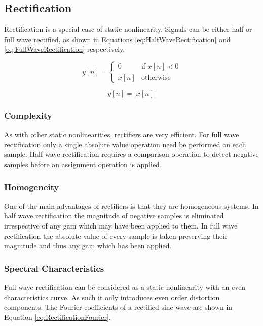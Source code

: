 	\subsection{Rectification}
	\label{sec:Excitation-Rectification}
		Rectification is a special case of static nonlinearity. Signals can be either half or full wave rectified,
		as shown in Equations \ref{eq:HalfWaveRectification} and \ref{eq:FullWaveRectification} respectively.

		\begin{equation}
			y[n] = \begin{cases}
				0 & \text{if $x[n] < 0$} \\
				x[n] & \text{otherwise}
			\end{cases}
			\label{eq:HalfWaveRectification}
		\end{equation}

		\begin{equation}
			y[n] = |x[n]|
			\label{eq:FullWaveRectification}
		\end{equation}

		\subsubsection*{Complexity}
			As with other static nonlinearities, rectifiers are very efficient. For full wave rectification
			only a single absolute value operation need be performed on each sample. Half wave rectification
			requires a comparison operation to detect negative samples before an assignment operation is
			applied.

		\subsubsection*{Homogeneity}
			One of the main advantages of rectifiers is that they are homogeneous systems. In half wave
			rectification the magnitude of negative samples is eliminated irrespective of any gain which may
			have been applied to them. In full wave rectification the absolute value of every sample is taken
			preserving their magnitude and thus any gain which has been applied.

		\subsubsection*{Spectral Characteristics}
			Full wave rectification can be considered as a static nonlinearity with an even characteristics
			curve. As such it only introduces even order distortion components. The Fourier coefficients of a
			rectified sine wave are shown in Equation \ref{eq:RectificationFourier}.


